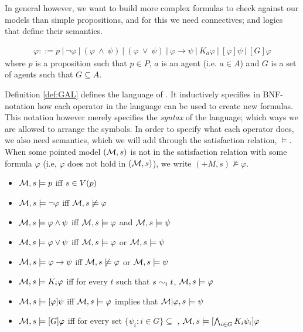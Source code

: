 In general however, we want to build more complex formulas to check against our models than simple propositions, and for this we need connectives; and logics that define their semantics.

\begin{definition} \hfill
	\label{def:GAL}
 	\begin{align*}
		\varphi ::= p \ | ~\neg\varphi ~|~ (\varphi~\wedge~\psi) ~|~ (\varphi~\vee~\psi) ~|~ \varphi 							
		\rightarrow \psi ~|~ K_a\varphi ~|~ [\varphi]\psi  ~|~ [G]\varphi
	\end{align*}
	where $p$ is a proposition such that $p \in P$, $a$ is an agent (i.e. $a \in A$) and $G$ is a set of agents such that $G \subseteq A$.
\end{definition}

Definition \ref{def:GAL} defines the language of . It inductively specifies in BNF-notation how each operator in the language can be used to create new formulas. This notation however merely specifies the \textit{syntax} of the language; which ways we are allowed to arrange the symbols. In order to specify what each operator does, we also need semantics, which we will add through the satisfaction relation, $\models$. When some pointed model $(\mathcal{M},s)$ is not in the satisfaction relation with some formula $\varphi$ (i.e, $\varphi$ does not hold in $(\mathcal{M},s)$), we write $(+M,s)\not\models\varphi$.

\begin{definition} \hfill
	\label{def:GALsem}
	\begin{itemize}
		\item[] $\mathcal{M},s \models p $ iff $ s \in V(p)$
		\item[] $\mathcal{M},s \models \neg\varphi$ iff $ \mathcal{M},s \not\models \varphi$
		\item[] $\mathcal{M},s \models \varphi \wedge \psi $ iff $ \mathcal{M},s \models \varphi $ and $ \mathcal{M},s \models \psi$
		\item[] $\mathcal{M},s \models \varphi \vee \psi $ iff $ \mathcal{M},s \models \varphi $ or $ \mathcal{M},s \models \psi$
		\item[] $\mathcal{M},s \models \varphi \rightarrow \psi $ iff $ \mathcal{M},s \not\models \varphi $ or $ \mathcal{M},s \models \psi$
		\item[] $\mathcal{M},s \models K_i\varphi $ iff for every $t$ such that $s\sim_{i}t$, $\mathcal{M},s \models \varphi$
		\item[] $\mathcal{M},s \models [\varphi]\psi $ iff $ \mathcal{M},s \models \varphi $ implies that $ \mathcal{M}|\varphi,s \models \psi$
		\item[] $\mathcal{M},s \models [G]\varphi $ iff for every set $\{\psi_i: i \in G\} \subseteq $ , $ \mathcal{M},s \models [\bigwedge_{i\in G}K_i\psi_i]\varphi$ 
	\end{itemize}
\end{definition}

